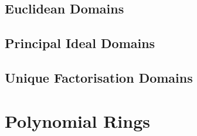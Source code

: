 \subsection{Euclidean Domains}
\subsection{Principal Ideal Domains}
\subsection{Unique Factorisation Domains}

\section{Polynomial Rings}


